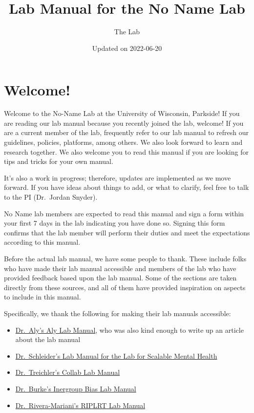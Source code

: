 \documentclass[
]{book}
\title{Lab Manual for the No Name Lab}
\author{The Lab}
\date{Updated on 2022-06-20}
\begin{document}
\maketitle

{
\setcounter{tocdepth}{1}
\tableofcontents
}
\hypertarget{welcome}{%
\chapter*{Welcome!}\label{welcome}}

Welcome to the No-Name Lab at the University of Wisconsin, Parkside! If you are reading our lab manual because you recently joined the lab, welcome! If you are a current member of the lab, frequently refer to our lab manual to refresh our guidelines, policies, platforms, among others. We also look forward to learn and research together. We also welcome you to read this manual if you are looking for tips and tricks for your own manual.

It's also a work in progress; therefore, updates are implemented as we move forward. If you have ideas about things to add, or what to clarify, feel free to talk to the PI (Dr.~Jordan Snyder).

No Name lab members are expected to read this manual and sign a form within your first 7 days in the lab indicating you have done so. Signing this form confirms that the lab member will perform their duties and meet the expectations according to this manual.

Before the actual lab manual, we have some people to thank. These include folks who have made their lab manual accessible and members of the lab who have provided feedback based upon the lab manual. Some of the sections are taken directly from these sources, and all of them have provided inspiration on aspects to include in this manual.

Specifically, we thank the following for making their lab manuals accessible:

\begin{itemize}
\item
  \href{https://github.com/alylab/labmanual/blob/master/aly-lab-manual.pdf}{Dr.~Aly's Aly Lab Manual}, who was also kind enough to write up an article about the lab manual \citep{aly2018key}
\item
  \href{https://osf.io/pwnsm/}{Dr.~Schleider's Lab Manual for the Lab for Scalable Mental Health}
\item
  \href{https://www.thecollablab.org/}{Dr.~Treichler's Collab Lab Manual}
\item
  \href{http://www.saraemilyburke.com/IntergroupBiasLabManual.pdf}{Dr.~Burke's Inergroup Bias Lab Manual}
\item
  \href{https://bookdown.org/friveram/labmanualriplrt/}{Dr.~Rivera-Mariani's RIPLRT Lab Manual}
\end{itemize}
\end{document}
